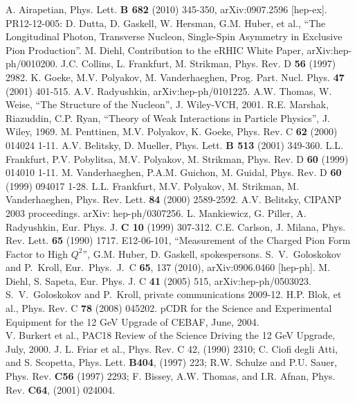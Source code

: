 \begin{thebibliography}{}

 A. Airapetian, Phys. Lett. {\bf B 682} (2010) 345-350,
  arXiv:0907.2596 [hep-ex].
 PR12-12-005:
D. Dutta, D. Gaskell, W. Hersman, G.M. Huber, et al., ``The Longitudinal
Photon, Transverse Nucleon, Single-Spin Asymmetry in Exclusive Pion
Production''.
 M. Diehl, Contribution to the eRHIC White Paper,
arXiv:hep-ph/0010200.
 J.C. Collins, L. Frankfurt, M. Strikman, Phys. Rev. D {\bf 56}
  (1997) 2982.
 K. Goeke, M.V. Polyakov, M. Vanderhaeghen,
  Prog. Part. Nucl. Phys. {\bf 47} (2001) 401-515.
 A.V. Radyushkin, arXiv:hep-ph/0101225.
 A.W. Thomas, W. Weise, ``The Structure of the Nucleon'',
  J. Wiley-VCH, 2001.
 R.E. Marshak, Riazuddin, C.P. Ryan, ``Theory of Weak
  Interactions in Particle Physics'', J. Wiley, 1969.
 M. Penttinen, M.V. Polyakov, K. Goeke, Phys. Rev. C {\bf 62}
  (2000) 014024 1-11.
 A.V. Belitsky, D. Mueller, Phys. Lett. {\bf B 513}
  (2001) 349-360.
 L.L. Frankfurt, P.V. Pobylitsa, M.V. Polyakov, M. Strikman,
  Phys. Rev. D {\bf 60} (1999) 014010 1-11.
 M. Vanderhaeghen, P.A.M. Guichon, M. Guidal, Phys. Rev. D 
  {\bf 60} (1999) 094017 1-28.
 L.L. Frankfurt, M.V. Polyakov, M. Strikman, M. Vanderhaeghen,
  Phys. Rev. Lett. {\bf 84} (2000) 2589-2592.
 A.V. Belitsky, CIPANP 2003 proceedings.  arXiv:
  hep-ph/0307256.
 L. Mankiewicz, G. Piller, A. Radyushkin, Eur. Phys. J. {\bf C
    10} (1999) 307-312.
 C.E. Carlson, J. Milana, Phys. Rev. Lett. {\bf 65} (1990) 1717.
 E12-06-101, ``Measurement of the Charged Pion Form Factor to
  High $Q^2$'', G.M. Huber, D. Gaskell, spokespersons.
 S.~V.~Goloskokov and P.~Kroll, Eur.\ Phys.\ J.\ C {\bf 65},
  137 (2010), arXiv:0906.0460 [hep-ph].
 M. Diehl, S. Sapeta, Eur. Phys. J. C {\bf 41} (2005) 515,
  arXiv:hep-ph/0503023.
 S.~V.~Goloskokov and P.~Kroll, private communications 2009-12.
 H.P. Blok, et al., Phys. Rev. C {\bf 78} (2008) 045202.
 pCDR for the Science and Experimental Equipment for the 12 GeV
  Upgrade of CEBAF, June, 2004.\\
V. Burkert et al., PAC18 Review of the Science Driving the 12 GeV Upgrade, 
  July, 2000.
J. L. Friar et al., Phys. Rev. C 42, (1990) 2310; C. Ciofi
degli Atti, and S. Scopetta, Phys. Lett. {\bf B404}, (1997) 223; R.W. Schulze
and P.U. Sauer, Phys. Rev. {\bf C56} (1997) 2293; F. Bissey, A.W. Thomas, and
I.R. Afnan, Phys. Rev. {\bf C64}, (2001) 024004.


\end{thebibliography}

